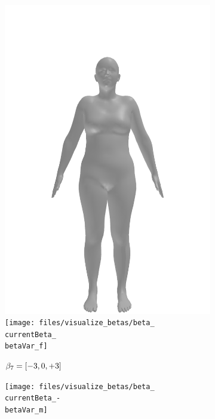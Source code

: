 \begin{figure}[h!]
\begin{subfigure}{\betaWidth}
        \includegraphics[width=\imgWidth]{files/visualize_betas/baseline_f}
        \texttt{[image: files/visualize\_betas/beta\_\\currentBeta\_\\betaVar\_f]}
        \caption{$\beta_7 = [-3, 0, +3]$}
    \end{subfigure}
    \begin{subfigure}{\betaWidth}
        \def\currentBeta{7}
        \centering
        \texttt{[image: files/visualize\_betas/beta\_\\currentBeta\_-\\betaVar\_m]}

\end{subfigure}
\end{figure}
